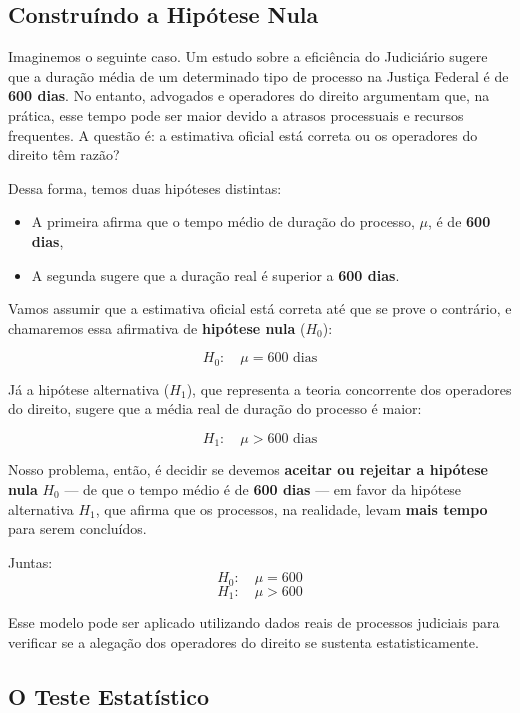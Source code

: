 \documentclass[
  letterpaper,
  DIV=11,
  numbers=noendperiod]{scrreprt}
\providecommand{\tightlist}{%
  \setlength{\itemsep}{0pt}\setlength{\parskip}{0pt}}
\begin{document}
\subsection{Construíndo a Hipótese
Nula}\label{construuxedndo-a-hipuxf3tese-nula}

Imaginemos o seguinte caso. Um estudo sobre a eficiência do Judiciário
sugere que a duração média de um determinado tipo de processo na Justiça
Federal é de \textbf{600 dias}. No entanto, advogados e operadores do
direito argumentam que, na prática, esse tempo pode ser maior devido a
atrasos processuais e recursos frequentes. A questão é: a estimativa
oficial está correta ou os operadores do direito têm razão?

Dessa forma, temos duas hipóteses distintas:

\begin{itemize}
\tightlist
\item
  A primeira afirma que o tempo médio de duração do processo, \(\mu\), é
  de \textbf{600 dias},
\item
  A segunda sugere que a duração real é superior a \textbf{600 dias}.
\end{itemize}

Vamos assumir que a estimativa oficial está correta até que se prove o
contrário, e chamaremos essa afirmativa de \textbf{hipótese nula}
(\(H_0\)):

\[H_0: \quad \mu = 600 \text{ dias}\]

Já a hipótese alternativa (\(H_1\)), que representa a teoria concorrente
dos operadores do direito, sugere que a média real de duração do
processo é maior:

\[ H_1: \quad \mu > 600 \text{ dias}\]

Nosso problema, então, é decidir se devemos \textbf{aceitar ou rejeitar
a hipótese nula} \(H_0\) --- de que o tempo médio é de \textbf{600 dias}
--- em favor da hipótese alternativa \(H_1\), que afirma que os
processos, na realidade, levam \textbf{mais tempo} para serem
concluídos.

Juntas:\\
\[H_0: \quad \mu = 600\] \[H_1: \quad \mu > 600\]

Esse modelo pode ser aplicado utilizando dados reais de processos
judiciais para verificar se a alegação dos operadores do direito se
sustenta estatisticamente.

\subsection{O Teste Estatístico}\label{o-teste-estatuxedstico}
\end{document}
